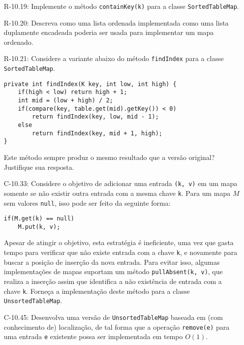 \begin{enumerate}
\begin{itemize}
		\item[R-10.19:] Implemente o método \texttt{containKey(k)} para a classe \texttt{SortedTableMap}.
		
		\item[R-10.20:] Descreva como uma lista ordenada implementada como uma lista duplamente encadeada poderia ser usada para implementar um mapa ordenado.
		
		\item[R-10.21:] Considere a variante abaixo do método \texttt{findIndex} para a classe \texttt{SortedTableMap}.
		
\begin{verbatim}
private int findIndex(K key, int low, int high) {
	if(high < low) return high + 1;
	int mid = (low + high) / 2;
	if(compare(key, table.get(mid).getKey()) < 0)
		return findIndex(key, low, mid - 1);
	else
		return findIndex(key, mid + 1, high);
}
\end{verbatim}
		
		Este método sempre produz o mesmo resultado que a versão original? Justifique sua resposta.
		
		\item[C-10.33:] Considere o objetivo de adicionar uma entrada \texttt{(k, v)} em um mapa somente se não existir outra entrada com a mesma chave \texttt{k}. Para um mapa $M$ sem valores \texttt{null}, isso pode ser feito da seguinte forma:
		
\begin{verbatim}
if(M.get(k) == null)
	M.put(k, v);
\end{verbatim}
		
		Apesar de atingir o objetivo, esta estratégia é ineficiente, uma vez que gasta tempo para verificar que não existe entrada com a chave \texttt{k}, e novamente para buscar a posição de inserção da nova entrada. Para evitar isso, algumas implementações de mapas suportam um método \texttt{pullAbsent(k, v)}, que realiza a inserção assim que identifica a não existência de entrada com a chave \texttt{k}. Forneça a implementação deste método para a classe \texttt{UnsortedTableMap}.
		
		\item[C-10.45:] Desenvolva uma versão de \texttt{UnsortedTableMap} baseada em (com conhecimento de) localização, de tal forma que a operação \texttt{remove(e)} para uma entrada \texttt{e} existente possa ser implementada em tempo $O(1)$.
	\end{itemize}
\end{enumerate}

\bigskip

\begingroup
	\footnotesize
	\renewcommand{\chapter}[2]{}%
	
	
\endgroup


